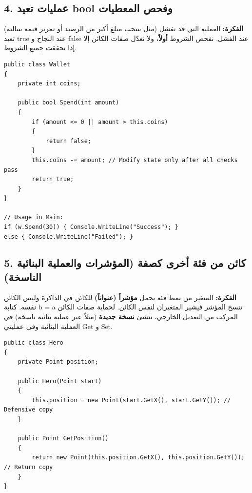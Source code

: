 \documentclass[14pt]{extarticle}
\begin{document}
\filbreak
\subsection*{4. عمليات تعيد \textenglish{bool} وفحص المعطيات}
\textbf{الفكرة:} العملية التي قد تفشل (مثل سحب مبلغ أكبر من الرصيد أو تمرير قيمة سالبة) تعيد \textenglish{true} عند النجاح و \textenglish{false} عند الفشل. نفحص الشروط \textbf{أولاً}، ولا نعدّل صفات الكائن إلا إذا تحققت جميع الشروط.

\begin{boxCode}
\begin{english}
\begin{verbatim}
public class Wallet
{
    private int coins;

    public bool Spend(int amount)
    {
        if (amount <= 0 || amount > this.coins)
        {
            return false;
        }
        this.coins -= amount; // Modify state only after all checks pass
        return true;
    }
}

// Usage in Main:
if (w.Spend(30)) { Console.WriteLine("Success"); }
else { Console.WriteLine("Failed"); }
\end{verbatim}
\end{english}
\end{boxCode}

\filbreak
\subsection*{5. كائن من فئة أخرى كصفة (المؤشرات والعملية البنائية الناسخة)}
\textbf{الفكرة:} المتغير من نمط فئة يحمل \textbf{مؤشراً (عنواناً)} للكائن في الذاكرة وليس الكائن نفسه. كتابة \textenglish{b = a} تنسخ المؤشر فيشير المتغيران لنفس الكائن. لحماية صفات الكائن المركب من التعديل الخارجي، ننشئ \textbf{نسخة جديدة} (مثلاً عبر عملية بنائية ناسخة) في العملية البنائية وفي عمليتي \textenglish{Get} و \textenglish{Set}.

\begin{boxCode}
\begin{english}
\begin{verbatim}
public class Hero
{
    private Point position;

    public Hero(Point start)
    {
        this.position = new Point(start.GetX(), start.GetY()); // Defensive copy
    }

    public Point GetPosition()
    {
        return new Point(this.position.GetX(), this.position.GetY()); // Return copy
    }
}
\end{verbatim}
\end{english}
\end{boxCode}
\end{document}
